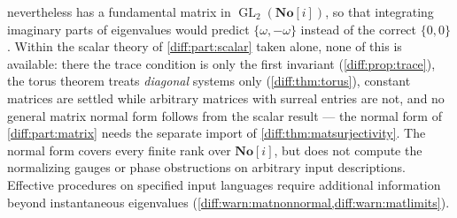 \documentclass[11pt,letterpaper]{article}
\numberwithin{equation}{section}
\theoremstyle{definition}
\theoremstyle{remark}
\newcommand{\SC}{\mathbf{No}[i]}
\newcommand{\GL}{\operatorname{GL}}
\begin{document}
\begin{enumerate}[label=\textup{N\arabic*.},leftmargin=3.0em,itemsep=0.35em,start=21]
nevertheless has a fundamental matrix in $\GL_{2}(\SC)$, so that integrating
imaginary parts of eigenvalues would predict $\{\omega,-\omega\}$ instead of
the correct $\{0,0\}$. Within the scalar theory of \cref{diff:part:scalar}
taken alone, none of this is available: there the trace condition is only the
first invariant (\cref{diff:prop:trace}), the torus theorem treats
\emph{diagonal} systems only (\cref{diff:thm:torus}), constant matrices are
settled while arbitrary matrices with surreal entries are not, and no general
matrix normal form follows from the scalar result --- the normal form of
\cref{diff:part:matrix} needs the separate import of
\cref{diff:thm:matsurjectivity}. The normal form covers every finite rank over
$\SC$, but does not compute the normalizing gauges or phase obstructions
on arbitrary input descriptions. Effective procedures on specified input
languages require additional information beyond instantaneous eigenvalues
(\cref{diff:warn:matnonnormal,diff:warn:matlimits}).


\end{enumerate}
\end{document}
